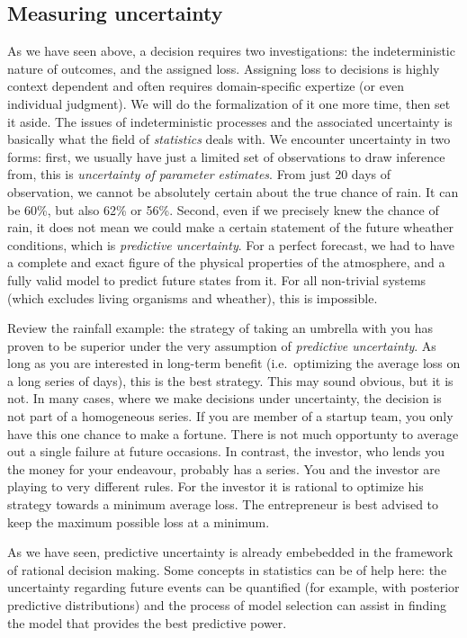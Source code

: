 \documentclass[]{svmono}
\theoremstyle{definition}
\theoremstyle{definition}
\theoremstyle{definition}
\theoremstyle{remark}
\begin{document}
\subsection{Measuring uncertainty}\label{measuring-uncertainty}

As we have seen above, a decision requires two investigations: the
indeterministic nature of outcomes, and the assigned loss. Assigning
loss to decisions is highly context dependent and often requires
domain-specific expertize (or even individual judgment). We will do the
formalization of it one more time, then set it aside. The issues of
indeterministic processes and the associated uncertainty is basically
what the field of \emph{statistics} deals with. We encounter uncertainty
in two forms: first, we usually have just a limited set of observations
to draw inference from, this is \emph{uncertainty of parameter
estimates}. From just 20 days of observation, we cannot be absolutely
certain about the true chance of rain. It can be 60\%, but also 62\% or
56\%. Second, even if we precisely knew the chance of rain, it does not
mean we could make a certain statement of the future wheather
conditions, which is \emph{predictive uncertainty}. For a perfect
forecast, we had to have a complete and exact figure of the physical
properties of the atmosphere, and a fully valid model to predict future
states from it. For all non-trivial systems (which excludes living
organisms and wheather), this is impossible.

Review the rainfall example: the strategy of taking an umbrella with you
has proven to be superior under the very assumption of \emph{predictive
uncertainty}. As long as you are interested in long-term benefit
(i.e.~optimizing the average loss on a long series of days), this is the
best strategy. This may sound obvious, but it is not. In many cases,
where we make decisions under uncertainty, the decision is not part of a
homogeneous series. If you are member of a startup team, you only have
this one chance to make a fortune. There is not much opportunty to
average out a single failure at future occasions. In contrast, the
investor, who lends you the money for your endeavour, probably has a
series. You and the investor are playing to very different rules. For
the investor it is rational to optimize his strategy towards a minimum
average loss. The entrepreneur is best advised to keep the maximum
possible loss at a minimum.

As we have seen, predictive uncertainty is already embebedded in the
framework of rational decision making. Some concepts in statistics can
be of help here: the uncertainty regarding future events can be
quantified (for example, with posterior predictive distributions) and
the process of model selection can assist in finding the model that
provides the best predictive power.
\end{document}
